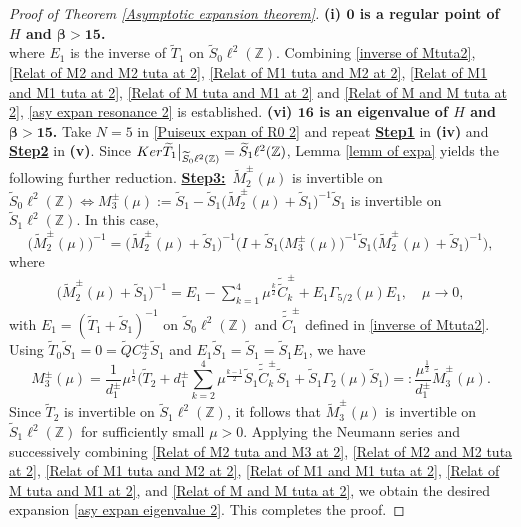 \documentclass[10pt,a4paper]{amsart}
\newcommand\Z{\mathbb{Z}}
\numberwithin{equation}{section}
\begin{document}
\begin{proof}[Proof of Theorem {\rm\ref{Asymptotic expansion theorem}}]{\bf{(i) ${\bm{0}}$ is a regular point of $H$ and {$\bm{\beta>15}$}.}}
\begin{equation}
\end{equation}
where $E_1$ is the inverse of $\widetilde{T}_1$ on $\widetilde{S}_0\ell^2(\Z)$.
Combining \eqref{inverse of Mtuta2}, \eqref{Relat of M2 and M2 tuta at 2}, \eqref{Relat of M1 tuta and M2 at 2}, \eqref{Relat of M1 and M1 tuta at 2}, \eqref{Relat of M tuta and M1 at 2} and \eqref{Relat of M and M tuta at 2}, \eqref{asy expan resonance 2} is established. 
\vskip0.2cm
{\bf{(vi) ${\bm{16}}$ is an eigenvalue of $H$ and {$\bm{\beta>15}$}.}} Take $N=5$ in \eqref{Puiseux expan of R0 2} and repeat {\bf{\underline{Step1}}} in {\bf{(iv)}} and {\bf{\underline{Step2}}} in {\bf{(v)}}. Since ${\rm Ker}\widetilde{T}_1\big|_{\widetilde{S}_0\ell^2(\Z)}=\widetilde{S}_1\ell^2(\Z)$, Lemma \ref{lemm of expa} yields the following further reduction.
\vskip0.15cm
{\bf{\underline{Step3:}}}\ $\widetilde{M}_{2}^{\pm}(\mu)$ is invertible on $\widetilde{S}_0\ell^{2}(\Z)\Leftrightarrow M^{\pm}_{3}(\mu):=\widetilde{S}_1-\widetilde{S}_1\big(\widetilde{M}_{2}^{\pm}(\mu)+\widetilde{S}_1\big)^{-1}\widetilde{S}_1$ is invertible on $\widetilde{S}_1\ell^{2}(\Z)$. In this case,
\begin{equation}\label{Relat of M2 tuta and M3 at 2}
\big(\widetilde{M}_{2}^{\pm}(\mu)\big)^{-1}=\big(\widetilde{M}_{2}^{\pm}(\mu)+\widetilde{S}_1\big)^{-1}\Big(I+\widetilde{S}_1\big(M^{\pm}_{3}(\mu)\big)^{-1}\widetilde{S}_1\big(\widetilde{M}_{2}^{\pm}(\mu)+\widetilde{S}_1\big)^{-1}\Big),
\end{equation}
where
\begin{align*}
\big(\widetilde{M}_{2}^{\pm}(\mu)+\widetilde{S}_1\big)^{-1}=E_1-\sum\limits_{k=1}^{4}\mu^{\frac{k}{2}}\tilde{\tilde{C}}^{\pm}_{k}+E_1\Gamma_{5/2}(\mu)E_1,\quad \mu\rightarrow0,
\end{align*}
with $E_1=(\widetilde{T}_1+\widetilde{S}_1)^{-1}$ on $\widetilde{S}_0\ell^2(\Z)$ and $\tilde{\tilde{C}}^{\pm}_{1}$ defined in \eqref{inverse of Mtuta2}. Using $\widetilde{T}_0\widetilde{S}_1=0=\widetilde{Q}C^{\pm}_2\widetilde{S}_1$ and $E_1\widetilde{S}_1=\widetilde{S}_1=\widetilde{S}_1E_1$, we have
\begin{equation*}
M^{\pm}_3(\mu)=\frac{1}{d^{\pm}_1}\mu^{\frac{1}{2}}\Big(\widetilde{T}_2+{d^{\pm}_1}\sum\limits_{k=2}^{4}\mu^{\frac{k-1}{2}}\widetilde{S}_1\tilde{\tilde{C}}^{\pm}_{k}\widetilde{S}_1+\widetilde{S}_1\Gamma_{2}(\mu)\widetilde{S}_1\Big)=:\frac{\mu^{\frac{1}{2}}}{d^{\pm}_1}\widetilde{M}^{\pm}_3(\mu).
\end{equation*}
Since $\widetilde{T}_2$ is invertible on $\widetilde{S}_1\ell^2(\Z)$, it follows that $\widetilde{M}^{\pm}_3(\mu)$ is invertible on $\widetilde{S}_1\ell^2(\Z)$ for sufficiently small $\mu>0$. Applying the Neumann series and successively combining \eqref{Relat of M2 tuta and M3 at 2}, \eqref{Relat of M2 and M2 tuta at 2}, \eqref{Relat of M1 tuta and M2 at 2}, \eqref{Relat of M1 and M1 tuta at 2}, \eqref{Relat of M tuta and M1 at 2}, and \eqref{Relat of M and M tuta at 2}, we obtain the desired expansion \eqref{asy expan eigenvalue 2}. This completes the proof.
\end{proof}
\end{document}
